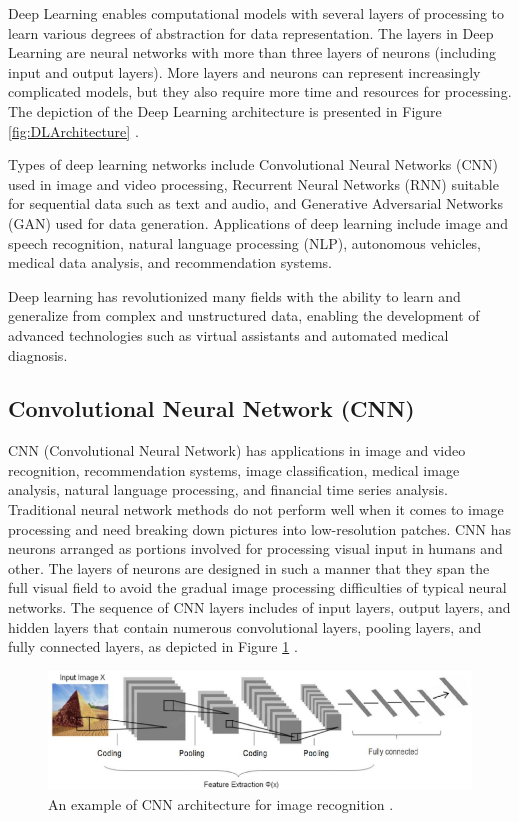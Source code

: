 Deep Learning enables computational models with several layers of processing to learn various degrees of abstraction for data representation. The layers in Deep Learning are neural networks with more than three layers of neurons (including input and output layers). More layers and neurons can represent increasingly complicated models, but they also require more time and resources for processing. The depiction of the Deep Learning architecture is presented in Figure \ref{fig:DLArchitecture} \cite{DL2}.

Types of deep learning networks include Convolutional Neural Networks (CNN) used in image and video processing, Recurrent Neural Networks (RNN) suitable for sequential data such as text and audio, and Generative Adversarial Networks (GAN) used for data generation. Applications of deep learning include image and speech recognition, natural language processing (NLP), autonomous vehicles, medical data analysis, and recommendation systems.

Deep learning has revolutionized many fields with the ability to learn and generalize from complex and unstructured data, enabling the development of advanced technologies such as virtual assistants and automated medical diagnosis.

\subsection{Convolutional Neural Network (CNN)}
CNN (Convolutional Neural Network) has applications in image and video recognition, recommendation systems, image classification, medical image analysis, natural language processing, and financial time series analysis. Traditional neural network methods do not perform well when it comes to image processing and need breaking down pictures into low-resolution patches. CNN has neurons arranged as portions involved for processing visual input in humans and other. The layers of neurons are designed in such a manner that they span the full visual field to avoid the gradual image processing difficulties of typical neural networks. The sequence of CNN layers includes of input layers, output layers, and hidden layers that contain numerous convolutional layers, pooling layers, and fully connected layers, as depicted in Figure \ref{fig:CNNArchitecture} \cite{CNN1}.

\begin{figure}[H]
    \centering
    \includegraphics[width=1\textwidth]{bab2/ar_CNNArchitecture.png}
    \caption{An example of CNN architecture for image recognition \cite{cnnarch}.}
    \label{fig:CNNArchitecture}
\end{figure}

